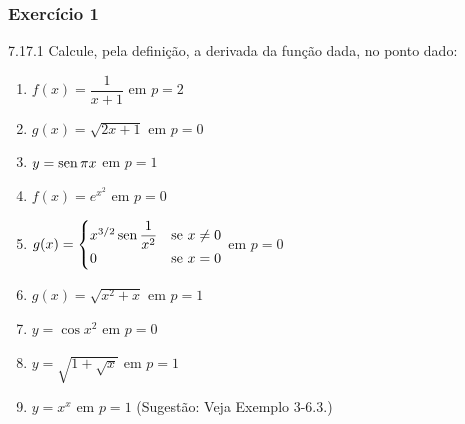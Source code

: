\subsubsection*{Exercício 1}
\begin{exercicio}[1]{7.17.1}
Calcule, pela definição, a derivada da função dada, no ponto dado:
\begin{enumerate}[label=\alph*)]
    \item $f(x) = \dfrac{1}{x + 1}$ em $p = 2$
    \item $g(x) = \sqrt{2x + 1}$ em $p = 0$
    \item $y = \operatorname{sen} \pi x$ em $p = 1$
    \item $f(x) = e^{x^2}$ em $p = 0$
    \item $g(x) = \begin{cases} x^{3/2} \operatorname{sen} \dfrac{1}{x^2} & \text{se } x \neq 0 \\ 0 & \text{se } x = 0 \end{cases}$ em $p = 0$
    \item $g(x) = \sqrt{x^2 + x}$ em $p = 1$
    \item $y = \cos x^2$ em $p = 0$
    \item $y = \sqrt{1 + \sqrt{x}}$ em $p = 1$
    \item $y = x^x$ em $p = 1$ (Sugestão: Veja Exemplo 3-6.3.)
\end{enumerate}
\end{exercicio}

